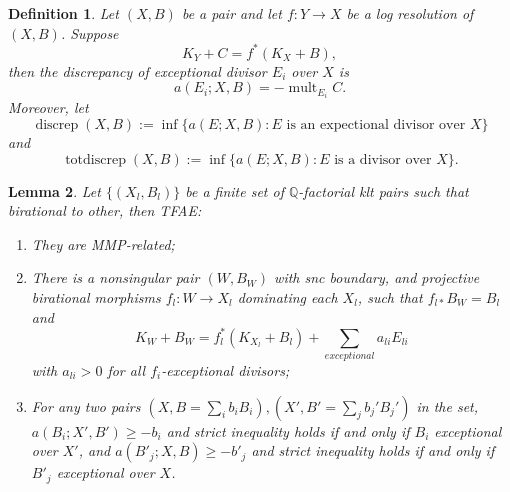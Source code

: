\documentclass{article}
\newtheorem{defn}{Definition}[subsection]
\newtheorem{lem}[defn]{Lemma}
\begin{document}
\begin{defn}
  Let $(X,B)$ be a pair  and let  $f:Y\to X$ be a log resolution of $(X,B)$. Suppose
  \[
  K_{Y}+C=f^*(K_{X}+B)
  ,\]
then the discrepancy  of exceptional divisor $E_{i}$ over $X$ is
\[
  a(E_{i};X,B)=-\operatorname{mult}_{E_{i}}C
.\]
 Moreover, let
\[
  \operatorname{discrep}(X, B) := \operatorname{inf}\{a(E; X, B) : E \text{ is an expectional divisor over } X \}
\]
and
\[
  \operatorname{totdiscrep}(X, B) :=\operatorname{inf}\{a(E; X, B) : E \text{ is a divisor over } X\}.
\]
\end{defn}
 \begin{lem}\label{MMPrelatedConditation}
  \cite[Proposition 3.4]{brunoLogSarkisovProgram1995}
  Let $ \{(X_l,B_l)\} $ be a finite set of $ \mathbb{Q} $-factorial klt pairs such that birational to other, then TFAE:
  \begin{enumerate}[a]
    \item They are MMP-related;
    \item There is a nonsingular pair $ (W,B_W) $ with snc boundary, and projective birational morphisms $ f_l:W\to  X_l $ dominating each $ X_l $, such that $ f_{l*}B_W=B_l $ and
      \[ K_W+B_W=f_l^*(K_{X_l}+B_l)+\sum_{exceptional}{a_{li}E_{li}} \]
      with $ a_{li}>0 $ for all $ f_i $-exceptional divisors;
    \item For any two pairs $ (X,B=\sum_ib_iB_i),(X',B'=\sum _jb_j'B_j') $ in the set,  $ a(B_i;X',B')\geqslant -b_i $ and strict inequality holds if and only if $ B_i $ exceptional over $ X' $, and $ a(B'_j;X,B)\geqslant -b'_j $ and strict inequality holds if and only if $ B'_j $ exceptional over $ X $.
  \end{enumerate}
\end{lem}
\end{document}
